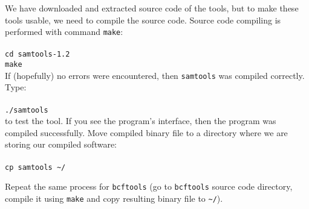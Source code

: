 We have downloaded and extracted source code of the tools, but to make
these tools usable, we need to compile the source code. Source code compiling
is performed with command \texttt{make}:\\~\\
\texttt{cd samtools-1.2}\\
\texttt{make}\\

If (hopefully) no errors were encountered, then \texttt{samtools} was compiled correctly. Type:\\~\\
\texttt{./samtools}\\

to test the tool. If you see the program's interface, then the program was compiled successfully.
Move compiled binary file to a directory where we are storing our compiled software:\\~\\
\texttt{cp samtools \textasciitilde/\binDir\\}

Repeat the same process for \texttt{bcftools}
(go to \texttt{bcftools} source code directory,
compile it using \texttt{make} and copy resulting binary file to \texttt{\textasciitilde/\binDir}).
